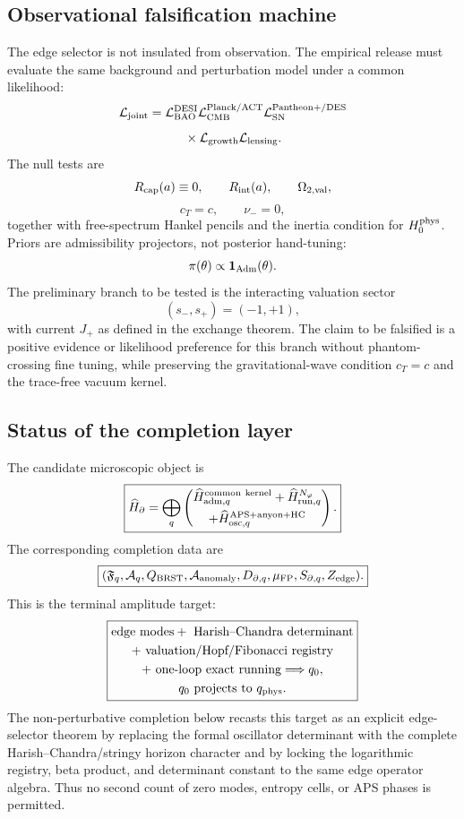 \documentclass[aps,prd,reprint,nofootinbib,superscriptaddress,floatfix]{revtex4-2}
\numberwithin{equation}{section}
\theoremstyle{definition}
\theoremstyle{plain}
\begin{document}
\subsection{Observational falsification machine}

The edge selector is not insulated from observation.  The empirical release
must evaluate the same background and perturbation model under a common
likelihood:
\[
\mathcal L_{\rm joint}
=
\mathcal L_{\rm BAO}^{\rm DESI}
\mathcal L_{\rm CMB}^{\rm Planck/ACT}
\mathcal L_{\rm SN}^{\rm Pantheon+/DES}
\]
\[
{}\times
\mathcal L_{\rm growth}
\mathcal L_{\rm lensing}.
\]
The null tests are
\[
R_{\rm cap}(a)\equiv0,\qquad
R_{\rm int}(a),\qquad
\Omega_{2,{\rm val}},
\]
\[
c_T=c,\qquad
\nu_-=0,
\]
together with free-spectrum Hankel pencils and the inertia condition for
\(H_0^{\rm phys}\).  Priors are admissibility projectors, not posterior
hand-tuning:
\[
\pi(\theta)\propto
\mathbf 1_{\rm Adm}(\theta).
\]
The preliminary branch to be tested is the interacting valuation sector
\[
(s_-,s_+)=(-1,+1),
\]
with current \(J_+\) as defined in the exchange theorem.  The claim to be
falsified is a positive evidence or likelihood preference for this branch
without phantom-crossing fine tuning, while preserving the gravitational-wave
condition \(c_T=c\) and the trace-free vacuum kernel.

\subsection{Status of the completion layer}

The candidate microscopic object is
\[
\boxed{
\widehat H_\partial
=
\bigoplus_q
\left(
\begin{gathered}
\widehat H_{{\rm adm},q}^{\rm common\ kernel}
+
\widehat H_{{\rm run},q}^{N_\varphi}
\\
+
\widehat H_{{\rm osc},q}^{\rm APS+anyon+HC}
\end{gathered}
\right).
}
\]
The corresponding completion data are
\[
\boxed{
(\mathfrak F_q,\mathcal A_q,Q_{\rm BRST},
\mathcal A_{\rm anomaly},D_{\partial,q},
\mu_{\rm FP},S_{\partial,q},Z_{\rm edge}).
}
\]
This is the terminal amplitude target:
\[
\boxed{
\begin{gathered}
\text{edge modes}
+\text{ Harish--Chandra determinant}
\\
+\text{ valuation/Hopf/Fibonacci registry}
\\
+\text{ one-loop exact running}
\Longrightarrow q_0,\\
q_0\ \text{projects to }q_{\rm phys}.
\end{gathered}
}
\]
The non-perturbative completion below recasts this target as an explicit
edge-selector theorem by replacing the formal oscillator determinant
with the complete Harish--Chandra/stringy horizon character and by locking the
logarithmic registry, beta product, and determinant constant to the same edge
operator algebra.  Thus no second count of zero modes, entropy cells, or APS
phases is permitted.
\end{document}
